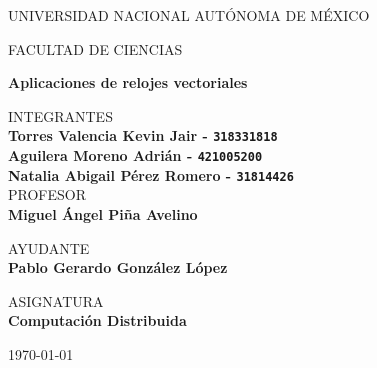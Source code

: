 \begin{center}
  \vspace{0.8cm}
  \LARGE
  UNIVERSIDAD NACIONAL AUTÓNOMA DE MÉXICO 
  
  \vspace{0.7cm}
  \LARGE
  FACULTAD DE CIENCIAS
  
  \vspace{0.8 cm}	
  \Large
  \textbf{Aplicaciones de relojes vectoriales}

  \vspace{0.8 cm}
  \normalsize	
  INTEGRANTES \\
  \vspace{.2cm}
  \large
  \textbf{Torres Valencia Kevin Jair - \texttt{318331818}}\\
  \textbf{Aguilera Moreno Adrián - \texttt{421005200}}\\
  \textbf{Natalia Abigail Pérez Romero  - \texttt{31814426}}\\
  
  \vspace{1 cm}
  \normalsize	
  PROFESOR \\
  \vspace{.2cm}
  \large
  \textbf{Miguel Ángel Piña Avelino}
  
  \vspace{1 cm}
  AYUDANTE \\
  \vspace{.2cm}
  \large
  \textbf{Pablo Gerardo González López}
  \vspace{1.3cm}
  
  \normalsize	
  ASIGNATURA \\
  \vspace{.2cm}
  \large
  \textbf{Computación Distribuida}
  
  \vspace{1 cm}
  \today
\end{center}
